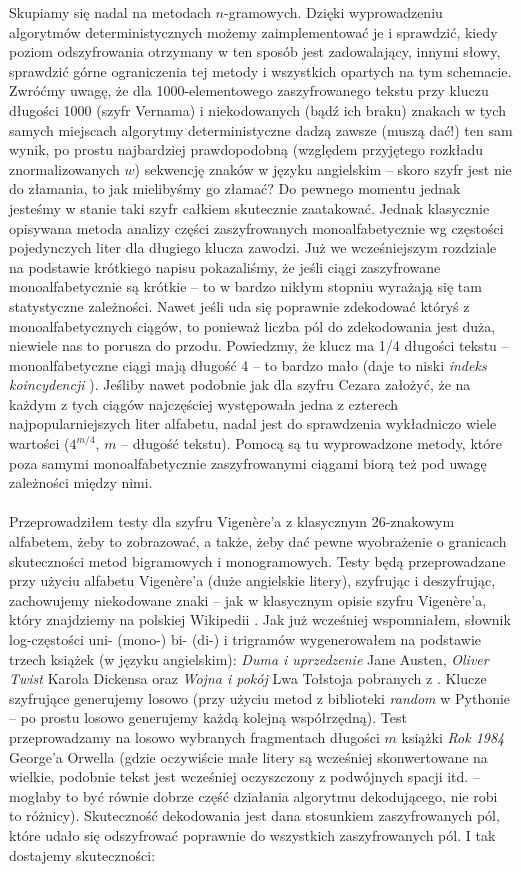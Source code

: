 \documentclass[a4paper]{article}
\theoremstyle{defn}
\theoremstyle{theorem}
\theoremstyle{lemma}
\theoremstyle{cor}
\theoremstyle{fact}
\begin{document}
Skupiamy się nadal na metodach $n$-gramowych. Dzięki wyprowadzeniu algorytmów deterministycznych możemy zaimplementować je i sprawdzić, kiedy poziom odszyfrowania otrzymany w ten sposób jest zadowalający, innymi słowy, sprawdzić górne ograniczenia tej metody i wszystkich opartych na tym schemacie. Zwróćmy uwagę, że dla 1000-elementowego zaszyfrowanego tekstu przy kluczu długości 1000 (szyfr Vernama) i niekodowanych (bądź ich braku) znakach w tych samych miejscach algorytmy deterministyczne dadzą zawsze (muszą dać!) ten sam wynik, po prostu najbardziej prawdopodobną (względem przyjętego rozkładu znormalizowanych $w$) sekwencję znaków w języku angielskim – skoro szyfr jest nie do złamania, to jak mielibyśmy go złamać? Do pewnego momentu jednak jesteśmy w stanie taki szyfr całkiem skutecznie zaatakować. Jednak klasycznie opisywana metoda analizy części zaszyfrowanych monoalfabetycznie wg częstości pojedynczych liter dla długiego klucza zawodzi. Już we wcześniejszym rozdziale na podstawie krótkiego napisu pokazaliśmy, że jeśli ciągi zaszyfrowane monoalfabetycznie są krótkie – to w bardzo nikłym stopniu wyrażają się tam statystyczne zależności. Nawet jeśli uda się poprawnie zdekodować któryś z monoalfabetycznych ciągów, to ponieważ liczba pól do zdekodowania jest duża, niewiele nas to porusza do przodu. Powiedzmy, że klucz ma 1/4 długości tekstu – monoalfabetyczne ciągi mają długość 4 – to bardzo mało (daje to niski \textit{indeks koincydencji} \cite{coinc}). Jeśliby nawet podobnie jak dla szyfru Cezara założyć, że na każdym z tych ciągów najczęściej występowała jedna z czterech najpopularniejszych liter alfabetu, nadal jest do sprawdzenia wykładniczo wiele wartości ($4^{m/4}$, $m$ – długość tekstu). Pomocą są tu wyprowadzone metody, które poza samymi monoalfabetycznie zaszyfrowanymi ciągami biorą też pod uwagę zależności między nimi. \\\\
Przeprowadziłem testy dla szyfru Vigenère'a z klasycznym 26-znakowym alfabetem, żeby to zobrazować, a także, żeby dać pewne wyobrażenie o granicach skuteczności metod bigramowych i monogramowych. Testy będą przeprowadzane przy użyciu alfabetu Vigenère'a (duże angielskie litery), szyfrując i deszyfrując, zachowujemy niekodowane znaki – jak w klasycznym opisie szyfru Vigenère'a, który znajdziemy na polskiej Wikipedii \cite{vigenere}. Jak już wcześniej wspomniałem, słownik log-częstości uni- (mono-) bi- (di-) i trigramów wygenerowałem na podstawie trzech książek (w języku angielskim): \textit{Duma i uprzedzenie} Jane Austen, \textit{Oliver Twist} Karola Dickensa oraz \textit{Wojna i pokój} Lwa Tołstoja pobranych z \cite{gutenberg}. Klucze szyfrujące generujemy losowo (przy użyciu metod z biblioteki \textit{random} w Pythonie – po prostu losowo generujemy każdą kolejną współrzędną). Test przeprowadzamy na losowo wybranych fragmentach długości $m$ książki \textit{Rok 1984} George'a Orwella (gdzie oczywiście małe litery są wcześniej skonwertowane na wielkie, podobnie tekst jest wcześniej oczyszczony z podwójnych spacji itd. – mogłaby to być równie dobrze część działania algorytmu dekodującego, nie robi to różnicy). Skuteczność dekodowania jest dana stosunkiem zaszyfrowanych pól, które udało się odszyfrować poprawnie do wszystkich zaszyfrowanych pól. I tak dostajemy skuteczności:\\
\end{document}
